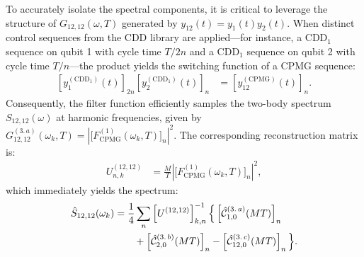\documentclass[%
 reprint,
superscriptaddress,
 amsmath,amssymb,
 aps,
pra,
]{revtex4-2}
\begin{document}
To accurately isolate the spectral components, it is critical to leverage the structure of $G_{12,12}(\omega, T)$ generated by $y_{12}(t)=y_1(t)y_2(t)$. When distinct control sequences from the CDD library are applied—for instance, a $\text{CDD}_1$ sequence on qubit 1 with cycle time $T/2n$ and a $\text{CDD}_1$ sequence on qubit 2 with cycle time $T/n$—the product yields the switching function of a CPMG sequence:
\begin{align}
    \left[y_1^{(\text{CDD}_1)}(t)\right]_{2n}\left[y_2^{(\text{CDD}_1)}(t)\right]_n&=\left[y_{12}^{(\text{CPMG})}(t)\right]_{n}.
\end{align}
Consequently, the filter function efficiently samples the two-body spectrum $S_{12,12}(\omega)$ at harmonic frequencies, given by $G^{(3.\,a)}_{12,12}(\omega_k, T)=\left|\big[F^{(1)}_{\text{CPMG}}(\omega_k, T)\big]_n\right|^2$. The corresponding reconstruction matrix is:
\begin{align}
    U_{n,k}^{(12,12)}&=\frac{M}{T}\left|\big[F^{(1)}_{\text{CPMG}}(\omega_k, T)\big]_n\right|^2,
\end{align}
which immediately yields the spectrum:
\begin{align}
    \hat{S}_{12,12}(\omega_k)&=\frac{1}{4}\sum_n\left[U^{(12,12)}\right]^{-1}_{k,n}\Big\{\left[\hat{\mathcal{C}}_{1,0}^{(3.\,a)}(MT)\right]_n\notag\\
    &\qquad+\left[\hat{\mathcal{C}}_{2,0}^{(3.\,b)}(MT)\right]_n-\left[\hat{\mathcal{C}}_{12,0}^{(3.\,c)}(MT)\right]_n\Big\}.
\end{align}
\end{document}
